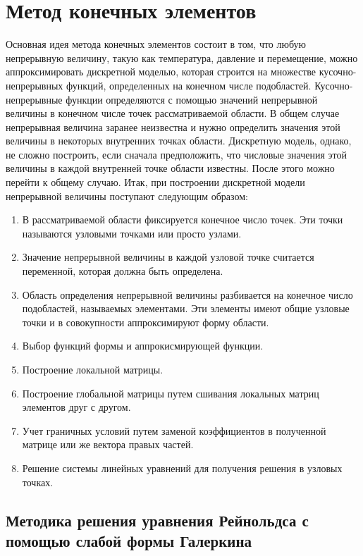 \documentclass[12pt, a4paper]{article}
\begin{document}
\section{Метод конечных элементов}

Основная идея метода конечных элементов состоит в том, что любую непрерывную величину, такую как температура, давление и перемещение, можно аппроксимировать дискретной моделью, которая строится на множестве кусочно-непрерывных функций, определенных на конечном числе подобластей. Кусочно-непрерывные функции определяются с помощью значений непрерывной величины в конечном числе точек рассматриваемой области.
В общем случае непрерывная величина заранее неизвестна и нужно определить значения этой величины в некоторых внутренних точках области. Дискретную модель, однако, не сложно построить, если сначала предположить, что числовые значения этой величины в каждой внутренней точке области известны. После этого можно перейти к общему случаю. Итак, при построении дискретной модели непрерывной величины поступают следующим образом:
\begin{enumerate}
	\item В рассматриваемой области фиксируется конечное число точек. Эти точки называются узловыми точками или просто узлами.
	\item Значение непрерывной величины в каждой узловой точке считается переменной, которая должна быть определена.
	\item Область определения непрерывной величины разбивается на конечное число подобластей, называемых элементами. Эти элементы имеют общие узловые точки и в совокупности аппроксимируют форму области.
	\item Выбор функций формы и аппрокисмирующей функции.
	\item Построение локальной матрицы.
	\item Построение глобальной матрицы путем сшивания локальных матриц элементов друг с другом.
	\item Учет граничных условий путем заменой коэффициентов в полученной матрице или же вектора правых частей.
	\item Решение системы линейных уравнений для получения решения в узловых точках.
\end{enumerate}

\subsection{Методика решения уравнения Рейнольдса с помощью слабой формы Галеркина}
\end{document}
